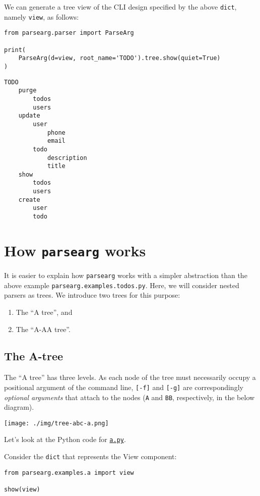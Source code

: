 \documentclass[10pt]{amsart}
\numberwithin{equation}{section}
\begin{document}
We can generate a tree view of the CLI design specified by the above \texttt{dict},
namely \texttt{view}, as follows:
\begin{verbatim}
from parsearg.parser import ParseArg

print(
    ParseArg(d=view, root_name='TODO').tree.show(quiet=True)
)
\end{verbatim}

\begin{verbatim}
TODO
    purge
        todos
        users
    update
        user
            phone
            email
        todo
            description
            title
    show
        todos
        users
    create
        user
        todo
\end{verbatim}

\section{How \texttt{parsearg} works}
\label{sec:org1f4197a}
It is easier to explain how \texttt{parsearg} works with a simpler abstraction 
than the above example \texttt{parsearg.examples.todos.py}. Here, we will 
consider nested parsers as trees. We introduce two trees for this purpose:
\begin{enumerate}
\item The ``A tree'', and
\item The ``A-AA tree''.
\end{enumerate}

\subsection{The A-tree}
\label{sec:org7d076ad}
The ``A tree'' has three levels. As each node of the tree must
necessarily occupy a positional argument of the command line,
\texttt{[-f]} and \texttt{[-g]} are correspondingly \emph{optional arguments} that attach to the nodes 
(\texttt{A} and \texttt{BB}, respectively, in the below diagram). 
\begin{center}
\texttt{[image: ./img/tree-abc-a.png]}
\end{center}

Let's look at the Python code for \href{https://github.com/tharte/parsearg/blob/master/parsearg/examples/a.py}{\texttt{a.py}}.

Consider the \texttt{dict} that represents the View component:
\begin{verbatim}
from parsearg.examples.a import view

show(view)
\end{verbatim}
\end{document}

